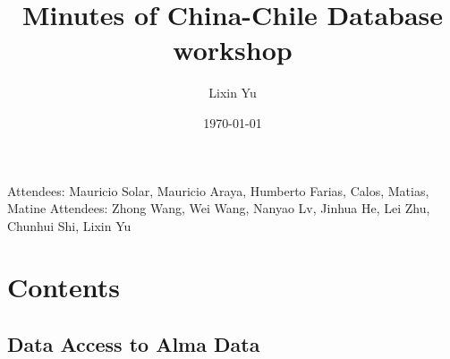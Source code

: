 \documentclass[11pt]{article}
\author{Lixin Yu}
\date{\today}
\title{Minutes of China-Chile Database workshop}
\begin{document}
\maketitle
\tableofcontents

\newpage

Attendees: Mauricio Solar, Mauricio Araya, Humberto Farias, Calos, Matias, Matine
Attendees: Zhong Wang, Wei Wang, Nanyao Lv, Jinhua He, Lei Zhu, Chunhui Shi, Lixin Yu


\section{Contents}
\label{sec-1}
\subsection{Data Access to Alma Data}
\label{sec-1-1}
\end{document}
